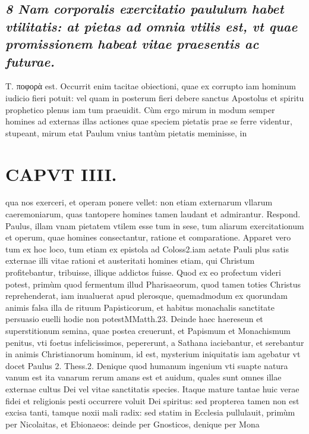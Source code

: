 \documentclass{article}
\begin{document}
\begin{pages}
\subsection*{\textit{8 Nam corporalis exercitatio paululum habet vtilitatis: at pietas ad omnia vtilis est, vt quae promissionem habeat vitae praesentis ac futurae. }}\pstart Τ. ποφορὰ est. Occurrit enim tacitae obiectioni, quae ex corrupto iam hominum iudicio fieri potuit: vel quam in posterum fieri debere sanctus Apostolus et spiritu prophetico plenus iam tum praeuidit. Cùm ergo mirum in modum semper homines ad externas illas actiones quae speciem pietatis prae se ferre videntur, stupeant, mirum etat Paulum vnius tantùm pietatis meminisse, in  \pend
\section*{CAPVT  IIII. }
\marginpar{[ p.209 ]}\pstart qua nos exerceri, et operam ponere vellet: non etiam externarum vllarum caeremoniarum, quas tantopere homines tamen laudant et admirantur. Respond. Paulus, illam vnam pietatem vtilem esse tum in sese, tum aliarum exercitationum et operum, quae homines consectantur, ratione et comparatione.  \pend\pstart Apparet vero tum ex hoc loco, tum etiam ex epistola ad Coloss2.iam aetate Pauli plus satis externae illi vitae rationi et austeritati homines etiam, qui Christum profitebantur, tribuisse, illique addictos fuisse. Quod ex eo profectum videri potest, primùm quod fermentum illud Pharisaeorum, quod tamen toties Christus reprehenderat, iam inualuerat apud plerosque, quemadmodum ex quorundam animis falsa illa de rituum Papisticorum, et habitus monachalis sanctitate persuasio euelli hodie non potestMMatth.23. Deinde haec haereseun et superstitionum semina, quae postea creuerunt, et Papismum et Monachismum penitus, vti foetus infelicissimos, pepererunt, a Sathana iaciebantur, et serebantur in animis Christianorum hominum, id est, mysterium iniquitatis iam agebatur vt docet Paulus 2. Thess.2. Denique quod humanum ingenium vti suapte natura vanum est ita vanarum rerum amans est et auidum, quales sunt omnes illae externae cultus Dei vel vitae sanctitatis species. Itaque mature tantae huic verae fidei et religionis pesti occurrere voluit Dei spiritus: sed propterea tamen non est excisa tanti, tamque  noxii mali radix: sed statim in Ecclesia pullulauit, primùm per Nicolaitas, et Ebionaeos: deinde per Gnosticos, denique per Mona\pend

\end{pages}
\end{document}
